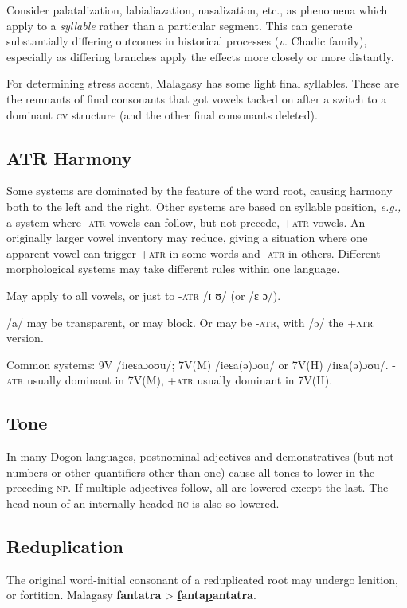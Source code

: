 \documentclass[11pt]{article}
\newcommand{\LL}[1]{\textbf{#1}}  %
\newcommand{\I}[1]{\textsc{#1}}   %
\begin{document}
Consider palatalization, labialiazation, nasalization, etc., as
phenomena which apply to a \textit{syllable} rather than a particular
segment. This can generate substantially differing outcomes in
historical processes (\textit{v.} Chadic family), especially as
differing branches apply the effects more closely or more distantly. 

For determining stress accent, Malagasy has some light final
syllables. These are the remnants of final consonants that got vowels
tacked on after a switch to a dominant \I{cv} structure (and the other
final consonants deleted).

\subsection{ATR Harmony}
Some systems are dominated by the feature of the word root, causing
harmony both to the left and the right. Other systems are based on
syllable position, \textit{e.g.,} a system where \I{-atr} vowels can
follow, but not precede, \I{+atr} vowels. An originally larger vowel
inventory may reduce, giving a situation where one apparent vowel can
trigger \I{+atr} in some words and \I{-atr} in others. Different
morphological systems may take different rules within one language.

May apply to all vowels, or just to \I{-atr} /ɪ ʊ/ (or /ɛ ɔ/).

/a/ may be transparent, or may block. Or may be \I{-atr}, with /ə/ the
\I{+atr} version.

Common systems: 9V /iɪeɛaɔoʊu/; 7V(M) /ieɛa(ə)ɔou/ or 7V(H)
/iɪɛa(ə)ɔʊu/. \I{-atr} usually dominant in 7V(M), \I{+atr} usually
dominant in 7V(H).

\subsection{Tone}
In many Dogon languages, postnominal adjectives and demonstratives
(but not numbers or other quantifiers other than one) cause all tones
to lower in the preceding \I{np}.  If multiple adjectives follow, all
are lowered except the last. The head noun of an internally headed
\I{rc} is also so lowered.

\subsection{Reduplication} The original word-initial consonant of a
reduplicated root may undergo lenition, or fortition.  Malagasy
\LL{fantatra} > \LL{\uline{f}anta\uline{p}antatra}.
\end{document}

